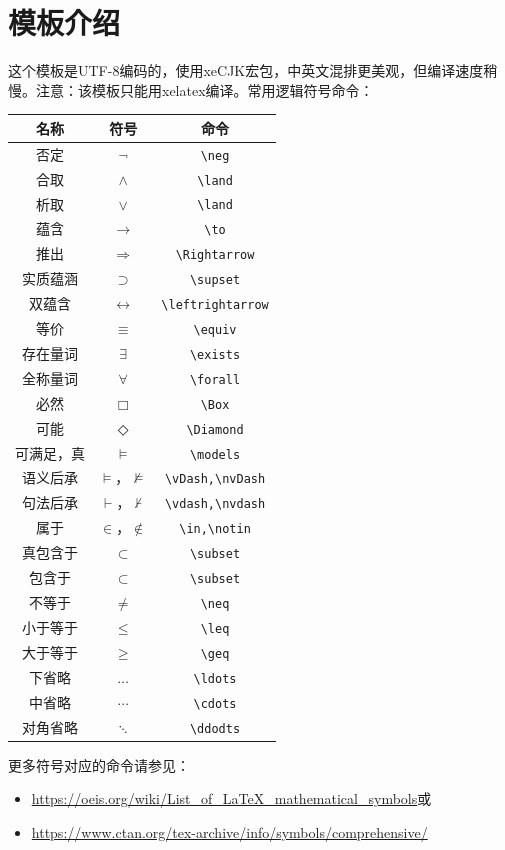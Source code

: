 \documentclass[hyperref, UTF8, 12pt]{article}
\theoremstyle{definition}
\begin{document}
\section{模板介绍}
这个模板是UTF-8编码的，使用xeCJK宏包，中英文混排更美观，但编译速度稍慢。注意：该模板只能用xelatex编译。常用逻辑符号命令：
\begin{center}
\begin{tabular}{|c|c|c|}
\hline
名称      & 符号                   & 命令 \\
\hline
否定      & $\neg$                & \verb|\neg| \\
合取      & $\land$               & \verb|\land| \\
析取      & $\lor$                & \verb|\land| \\
蕴含      & $\to$                 & \verb|\to| \\
推出      & $\Rightarrow$         & \verb|\Rightarrow| \\
实质蕴涵   & $\supset$             & \verb|\supset| \\
双蕴含     & $\leftrightarrow$     & \verb|\leftrightarrow| \\
等价      & $\equiv$              & \verb|\equiv| \\
存在量词   & $\exists$             & \verb|\exists| \\
全称量词   & $\forall$             & \verb|\forall| \\
必然      & $\Box$                & \verb|\Box| \\
可能      & $\Diamond$            & \verb|\Diamond| \\
可满足，真  & $\models$            & \verb|\models| \\
语义后承   & $\vDash$，$\nvDash$   & \verb|\vDash,\nvDash| \\
句法后承   & $\vdash$，$\nvdash$   & \verb|\vdash,\nvdash| \\
属于      & $\in$，$\notin$       & \verb|\in,\notin| \\
真包含于   & $\subset$             & \verb|\subset| \\
包含于     & $\subset$            & \verb|\subset| \\
不等于     & $\neq$               & \verb|\neq| \\
小于等于   & $\leq$               & \verb|\leq| \\
大于等于   & $\geq$               & \verb|\geq| \\
下省略    & $\ldots$              & \verb|\ldots| \\
中省略    & $\cdots$              & \verb|\cdots| \\
对角省略  & $\ddots$              & \verb|\ddodts| \\
\hline 
\end{tabular}
\end{center}
更多符号对应的命令请参见：
\begin{itemize}
  \item \url{https://oeis.org/wiki/List_of_LaTeX_mathematical_symbols}或
  \item \url{https://www.ctan.org/tex-archive/info/symbols/comprehensive/}
\end{itemize}
\end{document}
